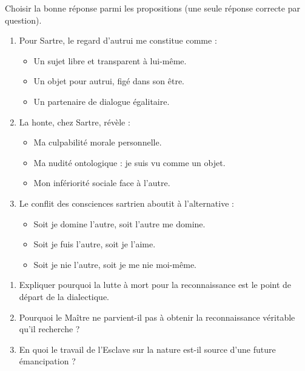 \documentclass[11pt]{article}
\begin{document}
\begin{exercice}
Choisir la bonne réponse parmi les propositions (une seule réponse correcte par question).
\begin{enumerate}
    \item Pour Sartre, le regard d'autrui me constitue comme :
    \begin{itemize}
        \item[A.] Un sujet libre et transparent à lui-même.
        \item[B.] Un objet pour autrui, figé dans son être.
        \item[C.] Un partenaire de dialogue égalitaire.
    \end{itemize}
    \item La honte, chez Sartre, révèle :
    \begin{itemize}
        \item[A.] Ma culpabilité morale personnelle.
        \item[B.] Ma nudité ontologique : je suis vu comme un objet.
        \item[C.] Mon infériorité sociale face à l'autre.
    \end{itemize}
    \item Le conflit des consciences sartrien aboutit à l'alternative :
    \begin{itemize}
        \item[A.] Soit je domine l'autre, soit l'autre me domine.
        \item[B.] Soit je fuis l'autre, soit je l'aime.
        \item[C.] Soit je nie l'autre, soit je me nie moi-même.
    \end{itemize}
\end{enumerate}
\end{exercice}

\begin{exercice}
\begin{enumerate}
    \item Expliquer pourquoi la lutte à mort pour la reconnaissance est le point de départ de la dialectique.
    \item Pourquoi le Maître ne parvient-il pas à obtenir la reconnaissance véritable qu'il recherche ?
    \item En quoi le travail de l'Esclave sur la nature est-il source d'une future émancipation ?
\end{enumerate}
\end{exercice}
\end{document}
